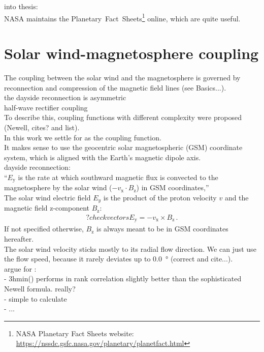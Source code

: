 into thesis:\\
NASA maintains the Planetary~Fact~Sheets\footnote{NASA Planetary Fact Sheets website: \url{https://nssdc.gsfc.nasa.gov/planetary/planetfact.html}} online, which are quite useful.\\



\section{Solar wind-magnetosphere coupling}
The coupling between the solar wind and the magnetosphere is governed by reconnection and compression of the magnetic field lines (see Basics...).\\

the dayside reconnection is asymmetric\\
half-wave rectifier coupling\\
To describe this, coupling functions with different complexity were proposed (Newell, cites? and list).\\

In this work we settle for \vBz{} as the coupling function.\\

It makes sense to use the geocentric solar magnetospheric (GSM) coordinate system, which is aligned with the Earth's magnetic dipole axis.\\

dayside reconnection:\\
``$E_\text{y}$ is the rate at which southward magnetic flux is convected to the magnetosphere by the solar wind ($-v_\text{x} \cdot B_\text{z}$) in GSM coordinates,'' \citep{Russell2007}\\

The solar wind electric field $E_y$ is the product of the proton velocity $v$ and the magnetic field z-component $B_\text{z}$:
\begin{align}
	?check vectors  E_\text{y} = -v_\text{x} \times B_\text{z}\,.	\label{eq:coupling_vxB}
\end{align}
If not specified otherwise, $B_\text{z}$ is always meant to be in GSM coordinates hereafter.\\

The solar wind velocity sticks mostly to its radial flow direction. We can just use the flow speed, because it rarely deviates up to \SI{0.0}{\degree} (correct and cite...).\\

argue for \vBz:\\
- 3hmin(\vBz) performs in rank correlation slightly better than the sophisticated Newell formula. really?\\
- simple to calculate\\
- ...\\

